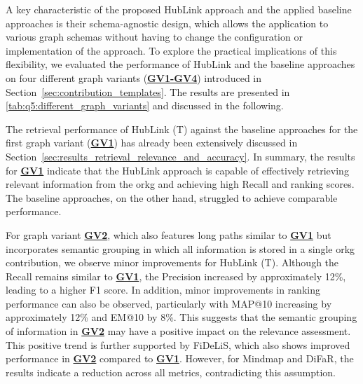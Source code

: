 A key characteristic of the proposed HubLink approach and the applied baseline approaches is their schema-agnostic design, which allows the application to various graph schemas without having to change the configuration or implementation of the approach. To explore the practical implications of this flexibility, we evaluated the performance of HubLink and the baseline approaches on four different graph variants (\hyperref[tab:q5:different_graph_variants]{\textbf{GV1-GV4}}) introduced in Section~\ref{sec:contribution_templates}. The results are presented in \autoref{tab:q5:different_graph_variants} and discussed in the following.

The retrieval performance of HubLink (T) against the baseline approaches for the first graph variant (\hyperref[enum:gv1]{\textbf{GV1}}) has already been extensively discussed in Section~\ref{sec:results_retrieval_relevance_and_accuracy}. In summary, the results for \hyperref[enum:gv1]{\textbf{GV1}} indicate that the HubLink approach is capable of effectively retrieving relevant information from the \gls{orkg} and achieving high Recall and ranking scores. The baseline approaches, on the other hand, struggled to achieve comparable performance.

For graph variant \hyperref[enum:gv2]{\textbf{GV2}}, which also features long paths similar to \hyperref[enum:gv1]{\textbf{GV1}} but incorporates semantic grouping in which all information is stored in a single \gls{orkg} contribution, we observe minor improvements for HubLink (T). Although the Recall remains similar to \hyperref[enum:gv1]{\textbf{GV1}}, the Precision increased by approximately 12\%, leading to a higher F1 score. In addition, minor improvements in ranking performance can also be observed, particularly with MAP@10 increasing by approximately 12\% and EM@10 by 8\%. This suggests that the semantic grouping of information in \hyperref[enum:gv2]{\textbf{GV2}} may have a positive impact on the relevance assessment. This positive trend is further supported by FiDeLiS, which also shows improved performance in \hyperref[enum:gv2]{\textbf{GV2}} compared to \hyperref[enum:gv1]{\textbf{GV1}}. However, for Mindmap and DiFaR, the results indicate a reduction across all metrics, contradicting this assumption.

